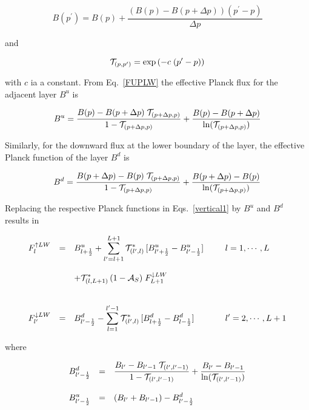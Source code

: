 \begin{equation}
B(p^{\prime})= B(p) + \frac{(B(p)-B(p+\Delta p)) (p^{\prime} - p)}{\Delta p}
\end{equation}

and

\begin{equation}
{\cal T}_{(p, p^{\prime})} = \exp{(-c\; (p^{\prime}-p))}
\end{equation}

with $c$ ia a constant. From Eq.~\ref{FUPLW} the effective Planck flux for the adjacent layer
$B^u$ is 

\begin{equation}
B^u=\frac{B(p)-B(p+\Delta p)\;{\cal T}_{(p+\Delta p, p)}}{1-{\cal T}_{(p+\Delta p, p)}}
+\frac{B(p)-
B(p+\Delta p)}{\ln({\cal T}_{(p+\Delta p, p)})}
\end{equation}

Similarly, for the downward flux at the lower boundary of the layer, the effective Planck
function of the layer $B^d$ is 

\begin{equation}
B^d=\frac{B(p+\Delta p)-B(p)\;{\cal T}_{(p+\Delta p, p)}}{1-{\cal T}_{(p+\Delta p, p)}}
+\frac{B(p+\Delta
p)-B(p)}{\ln({\cal T}_{(p+\Delta p, p)})}
\end{equation}

Replacing the respective Planck functions in Eqs.~\ref{vertical1} by $B^u$ and $B^d$ results
in

\begin{equation}\label{vertical2}
\begin{array}{rclcl}
\displaystyle F_l^{\uparrow LW}& = &\displaystyle  B^u_{l+\frac{1}{2}} + 
\sum\limits_{l^\prime=l+1}^{L+1} {\cal T}^*_{(l^\prime ,
l)} \,
[B^u_{l^\prime+\frac{1}{2}} - B^u_{l^\prime-
\frac{1}{2}}] &  & \displaystyle \;\; l=1,  \cdots , L\\
&&&&\\
 & & \displaystyle + {\cal T}^*_{(l,L+1)} \, (1-{\cal A}_S) \; F_{L+1}^{\downarrow LW} & & \\
& & & &  \\
&&&&\\
\displaystyle F_{l^\prime}^{\downarrow LW}& = & \displaystyle
B^d_{l^\prime-
\frac{1}{2}} - \sum\limits_{l=1}^{l^\prime-1} {\cal T}^*_{(l^\prime , l)} \,
[B^d_{l+\frac{1}{2}}
-
B^d_{l-\frac{1}{2}}]
& & \displaystyle \;\; l^\prime=2,  \cdots , L+1
\end{array}
\end{equation}

where 

\begin{equation}
\begin{array}{lcl}
\displaystyle B^d_{l^{\prime}-\frac{1}{2}} & = & \displaystyle \frac{B_{l^{\prime}}-B_{l^{\prime}-1} \;
{\cal T}_{(l^{\prime},l^{\prime}-1)}}{1-{\cal T}_{(l^{\prime},l^{\prime}-1)}} +
\frac{B_{l^{\prime}} - B_{l^{\prime}-1}}{\ln({\cal T}_{(l^{\prime},l^{\prime}-1)})} \\
&& \\
\displaystyle B^u_{l^{\prime}-\frac{1}{2}} & = & \displaystyle (B_{l^{\prime}} + B_{l^{\prime}-1} ) -
B^d_{l^{\prime}-\frac{1}{2}}
\end{array}
\end{equation}

